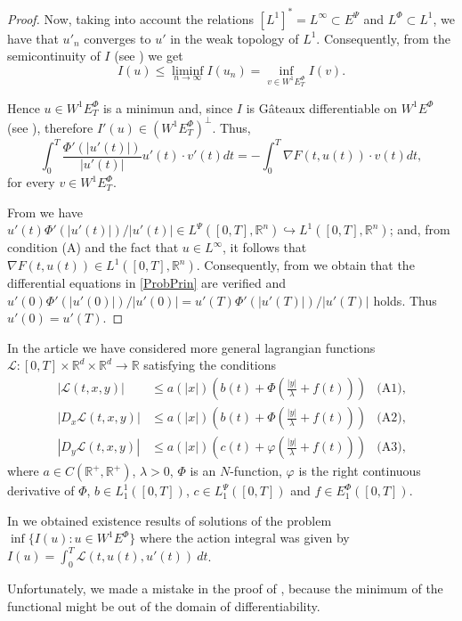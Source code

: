 \documentclass[twoside]{article}
\theoremstyle{remark}
\newcommand{\lphi}{L^{\Phi}}
\newcommand{\lpsi}{L^{\Psi}}
\newcommand{\ephi}{E^{\Phi}}
\newcommand{\wphiet}{W^{1}\ephi_T}
\newcommand{\wphie}{W^{1}\ephi}
\newcommand{\rr}{\mathbb{R}}
\renewcommand{\leq}{\leqslant}
\newcommand{\epsi}{E^{\Psi}}
\begin{document}
\begin{proof}
Now, taking into account the relations $\left[L^1\right]^*=L^{\infty}\subset  \epsi$ and $\lphi\subset L^1$, we have that $u'_n$ converges to $u'$ in the weak topology of $L^1$. Consequently,  from the semicontinuity of $I$ (see \cite[Lemma 6.1]{ABGMS2015})  we get 
\[I(u)\leq  \liminf_{n\to\infty}I(u_n)=\inf\limits_{v\in\wphie_T}I(v).\]

Hence $u\in \wphiet$ is a minimun and, since $I$ is G\^ateaux differentiable on $\wphie$ (see  \cite[Thm. 3.2]{ABGMS2015}), 
therefore $I'(u)\in (\wphiet)^{\perp}$. Thus,
\[\int_0^T \frac{\Phi'(|u'(t)|)}{|u'(t)|}u'(t)\cdot v'(t)dt =-\int_0^T \nabla F(t,u(t))\cdot v(t)dt,\]
for every  $v\in \wphiet$.  

From \cite[Lemma 2.4]{ABGMS2015} we have 
 $u'(t)\Phi'(|u'(t)|)/|u'(t)|\in \lpsi([0,T],\rr^n)\hookrightarrow L^1([0,T],\rr^n)$; 
and,  from condition (A) and the fact that $u\in L^{\infty}$, it follows that $\nabla F(t,u(t))\in L^1([0,T],\rr^n)$. 
Consequently, from \cite[p. 6]{mawhin2010critical} we obtain that the differential equations in \eqref{ProbPrin} 
are verified and $u'(0)\Phi'(|u'(0)|)/|u'(0)|=u'(T)\Phi'(|u'(T)|)/|u'(T)|$ holds. Thus $u'(0)=u'(T)$.
\end{proof}



In the article \cite{ABGMS2015} we have considered more general lagrangian functions 
$\mathcal{L}:[0,T]\times\rr^d\times\rr^d\to\rr$ 
satisfying the conditions
\begin{align*}
|\mathcal{L}(t,x,y)| &\leq a(|x|)\left(b(t)+ \Phi\left(\frac{|y|}{\lambda}+f(t) \right)\right)&\text{(A1),}
\\
|D_{x}\mathcal{L}(t,x,y)| &\leq a(|x|)\left(b(t)+ \Phi\left(\frac{|y|}{\lambda}+f(t) \right)\right)&\text{(A2),}
\\
|D_{y}\mathcal{L}(t,x,y)| &\leq a(|x|)\left(c(t)+ \varphi\left(\frac{|y|}{\lambda}+f(t)\right)\right)
&\text{(A3),}
\end{align*}
where $a\in C(\mathbb{R}^+,\mathbb{R}^+)$, $\lambda>0$, $\Phi$ is an $N$-function, 
$\varphi$ is the right continuous derivative of $\Phi$,  
$b\in L^1_1([0,T])$,  $c\in\lpsi_1([0,T])$ and  $f\in \ephi_1([0,T])$.

In  \cite[Thm. 6.2]{ABGMS2015} we obtained existence results of solutions of the problem 
$\inf\{I(u):u \in \wphie \}$ 
where the action integral was given by $I(u)=\int_{0}^T \mathcal{L}(t,u(t),u'(t))\ dt$. 

Unfortunately, we made a mistake in the proof of \cite[Thm. 4.1]{ABGMS2015}, 
because  the minimum of the functional  might be out of the domain of differentiability.
\end{document}
